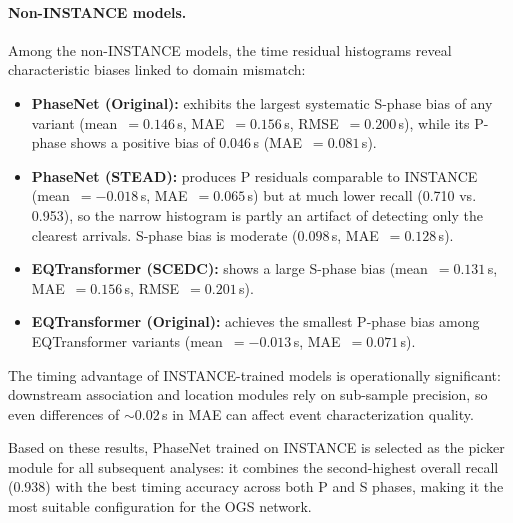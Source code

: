 \paragraph{Non-INSTANCE models.}
Among the non-INSTANCE models, the time residual histograms reveal
characteristic biases linked to domain mismatch:
\begin{itemize}
  \item \textbf{PhaseNet (Original):} exhibits the largest systematic S-phase
    bias of any variant (mean~$=0.146$\,s, MAE~$=0.156$\,s, RMSE~$=0.200$\,s),
    while its P-phase shows a positive bias of $0.046$\,s (MAE~$= 0.081$\,s).
  \item \textbf{PhaseNet (STEAD):} produces P residuals comparable to INSTANCE
    (mean~$=-0.018$\,s, MAE~$=0.065$\,s) but at much lower recall (0.710 vs.
    0.953), so the narrow histogram is partly an artifact of detecting only the
    clearest arrivals. S-phase bias is moderate ($0.098$\,s, MAE~$=0.128$\,s).
  \item \textbf{EQTransformer (SCEDC):} shows a large S-phase bias
    (mean~$=0.131$\,s, MAE~$=0.156$\,s, RMSE~$=0.201$\,s).
  \item \textbf{EQTransformer (Original):} achieves the smallest P-phase bias
    among EQTransformer variants (mean~$=-0.013$\,s, MAE~$= 0.071$\,s).
\end{itemize}

The timing advantage of INSTANCE-trained models is operationally significant:
downstream association and location modules rely on sub-sample precision, so
even differences of $\sim$0.02\,s in MAE can affect event characterization
quality.

Based on these results, PhaseNet trained on INSTANCE is selected as the picker
module for all subsequent analyses: it combines the second-highest overall
recall (0.938) with the best timing accuracy across both P and S phases, making
it the most suitable configuration for the OGS network.

